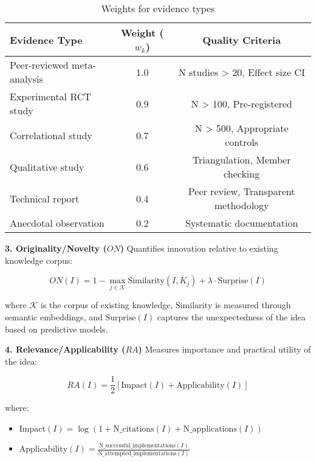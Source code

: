 \begin{table}[h]
	\centering
	\caption{Weights for evidence types}
	\label{tab:evidence-weights}
	\begin{tabular}{lcc}
		\toprule
		\textbf{Evidence Type} & \textbf{Weight ($w_k$)} & \textbf{Quality Criteria} \\
		\midrule
		Peer-reviewed meta-analysis & 1.0 & N studies > 20, Effect size CI \\
		Experimental RCT study & 0.9 & N > 100, Pre-registered \\
		Correlational study & 0.7 & N > 500, Appropriate controls \\
		Qualitative study & 0.6 & Triangulation, Member checking \\
		Technical report & 0.4 & Peer review, Transparent methodology \\
		Anecdotal observation & 0.2 & Systematic documentation \\
		\bottomrule
	\end{tabular}
\end{table}

\textbf{3. Originality/Novelty ($ON$)}
Quantifies innovation relative to existing knowledge corpus:

\begin{equation}
	ON(I) = 1 - \max_{j \in \mathcal{K}} \text{Similarity}(I, K_j) + \lambda \cdot \text{Surprise}(I)
	\label{eq:originality}
\end{equation}

where $\mathcal{K}$ is the corpus of existing knowledge, $\text{Similarity}$ is measured through semantic embeddings, and $\text{Surprise}(I)$ captures the unexpectedness of the idea based on predictive models.

\textbf{4. Relevance/Applicability ($RA$)}
Measures importance and practical utility of the idea:

\begin{equation}
	RA(I) = \frac{1}{2}[\text{Impact}(I) + \text{Applicability}(I)]
	\label{eq:relevance}
\end{equation}

where:
\begin{itemize}
	\item $\text{Impact}(I) = \log(1 + \text{N\_citations}(I) + \text{N\_applications}(I))$
	\item $\text{Applicability}(I) = \frac{\text{N\_successful\_implementations}(I)}{\text{N\_attempted\_implementations}(I)}$
\end{itemize}

